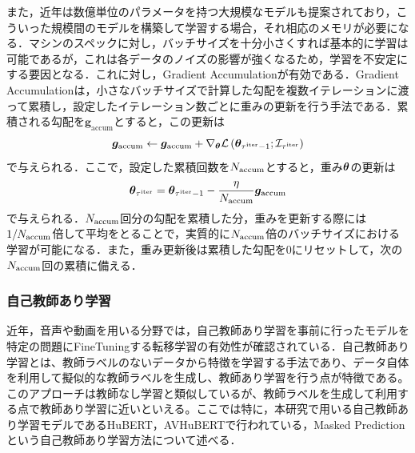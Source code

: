 \documentclass[12pt]{jarticle}
\numberwithin{equation}{section}    %
\numberwithin{figure}{section}      %
\numberwithin{table}{section}      %
\begin{document}
また，近年は数億単位のパラメータを持つ大規模なモデルも提案されており，こういった規模間のモデルを構築して学習する場合，それ相応のメモリが必要になる．マシンのスペックに対し，バッチサイズを十分小さくすれば基本的に学習は可能であるが，これは各データのノイズの影響が強くなるため，学習を不安定にする要因となる．これに対し，Gradient Accumulationが有効である．Gradient Accumulationは，小さなバッチサイズで計算した勾配を複数イテレーションに渡って累積し，設定したイテレーション数ごとに重みの更新を行う手法である．累積される勾配を$\bm{g}_{\text{accum}}$とすると，この更新は
\begin{equation}
    \bm{g}_{\text{accum}} \gets \bm{g}_{\text{accum}} + \nabla_{\bm{\theta}} \mathcal{L}\left(\bm{\theta}_{\tau^{\text{iter}} - 1}; \mathcal{I}_{\tau^{\text{iter}}}\right)
\end{equation}
で与えられる．ここで，設定した累積回数を$N_{\text{accum}}$とすると，重み$\bm{\theta}$の更新は
\begin{equation}
    \bm{\theta}_{\tau^{\text{iter}}} = \bm{\theta}_{\tau^{\text{iter}} - 1} - \frac{\eta}{N_{\text{accum}}} \bm{g}_{\text{accum}}
\end{equation}
で与えられる．$N_{\text{accum}}$回分の勾配を累積した分，重みを更新する際には$1 / N_{\text{accum}}$倍して平均をとることで，実質的に$N_{\text{accum}}$倍のバッチサイズにおける学習が可能になる．また，重み更新後は累積した勾配を0にリセットして，次の$N_{\text{accum}}$回の累積に備える．

\subsubsection{自己教師あり学習}
近年，音声や動画を用いる分野では，自己教師あり学習を事前に行ったモデルを特定の問題にFineTuningする転移学習の有効性が確認されている．自己教師あり学習とは、教師ラベルのないデータから特徴を学習する手法であり、データ自体を利用して擬似的な教師ラベルを生成し、教師あり学習を行う点が特徴である。このアプローチは教師なし学習と類似しているが、教師ラベルを生成して利用する点で教師あり学習に近いといえる。ここでは特に，本研究で用いる自己教師あり学習モデルであるHuBERT\cite{hsu2021hubert}，AVHuBERT\cite{shi2022learning}で行われている，Masked Predictionという自己教師あり学習方法について述べる．
\end{document}
